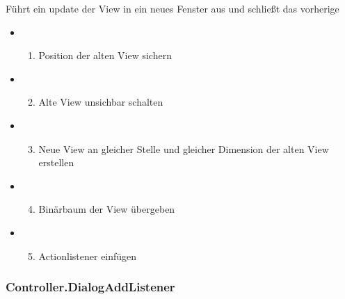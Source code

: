 \documentclass[letterpaper,10pt,ngerman]{sphinxmanual}
\begin{document}
\begin{fulllineitems}
\label{\detokenize{com/linuxluigi/edu/Controller:com.linuxluigi.edu.Controller.updateViewInNewWindow()}}
Führt ein update der View in ein neues Fenster aus und schließt das vorherige
\begin{itemize}
\item {} \begin{enumerate}
\item {} 
Position der alten View sichern

\end{enumerate}

\item {} \begin{enumerate}
\setcounter{enumi}{1}
\item {} 
Alte View unsichbar schalten

\end{enumerate}

\item {} \begin{enumerate}
\setcounter{enumi}{2}
\item {} 
Neue View an gleicher Stelle und gleicher Dimension der alten View erstellen

\end{enumerate}

\item {} \begin{enumerate}
\setcounter{enumi}{3}
\item {} 
Binärbaum der View übergeben

\end{enumerate}

\item {} \begin{enumerate}
\setcounter{enumi}{4}
\item {} 
Actionlistener einfügen

\end{enumerate}

\end{itemize}

\end{fulllineitems}



\subsubsection{Controller.DialogAddListener}
\label{\detokenize{com/linuxluigi/edu/Controller-DialogAddListener:controller-dialogaddlistener}}\label{\detokenize{com/linuxluigi/edu/Controller-DialogAddListener::doc}}
\end{document}
